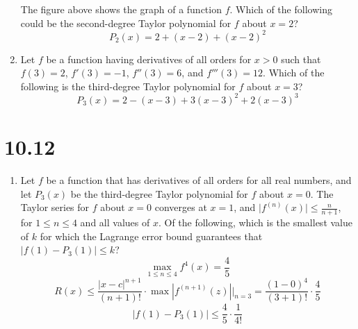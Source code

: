 \documentclass[12pt]{article}
\begin{document}
\begin{enumerate}
\begin{center}
	      \end{center}
	      The figure above shows the graph of a function $f$. Which of the following could be the second-degree Taylor polynomial for $f$ about $x = 2$?
	      $$\boxed{P_2(x)=2+(x-2)+(x-2)^2}$$
	\item Let $f$ be a function having derivatives of all orders for $x>0$
	      such that $f(3)=2$, $f'(3)=-1$, $f''(3)=6$, and $f'''(3)=12$. Which of the following is the third-degree Taylor polynomial for $f$ about $x=3$?
	      $$\boxed{P_3(x)= 2 - (x - 3) + 3(x - 3)^2 + 2(x-3)^3}$$
\end{enumerate}
\section*{10.12}
\begin{enumerate}
	\item Let $f$ be a function that has derivatives of all orders for all real numbers, and let $P_{3}(x)$ be the third-degree Taylor polynomial for $f$ about $x = 0$. The Taylor series for $f$ about $x = 0$ converges at $x = 1$, and $\big|f^{(n)}(x)\big| \leq \frac{n}{n+1}$, for $1 \leq n \leq 4$ and all values of $x$. Of the following, which is the smallest value of $k$ for which the Lagrange error bound guarantees that $|f(1)-P_3(1)| \leq k$?
	$$\max_{1 \leq n \leq 4} f^{4}(x) = \frac{4}{5}$$
	$$R(x) \leq \frac{|x-c|^{n+1}}{(n+1)!} \cdot \max|f^{(n+1)}(z)| \biggr\rvert_{n=3} = \frac{(1-0)^4}{(3+1)!} \cdot \frac{4}{5}$$
	$$\left| f(1)-P_3(1) \right| \leq \boxed{ \frac{4}{5} \cdot \frac{1}{4!}}$$
	

\end{enumerate}
\end{document}
